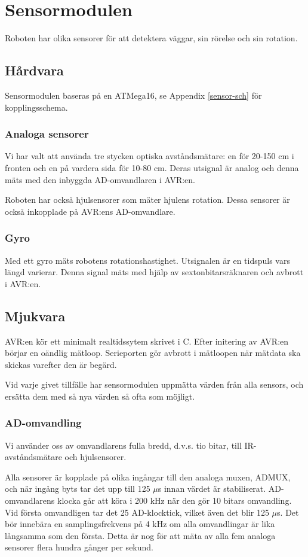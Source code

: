 \section{Sensormodulen}
Roboten har olika sensorer för att detektera väggar, sin rörelse och sin
rotation. 

\subsection{Hårdvara}
Sensormodulen baseras på en ATMega16, se Appendix \ref{sensor-sch} för
kopplingsschema.

\subsubsection{Analoga sensorer}
Vi har valt att använda tre stycken optiska avståndsmätare: en för 20-150 cm i
fronten och en på vardera sida för 10-80 cm. Deras utsignal är analog och denna
mäts med den inbyggda AD-omvandlaren i AVR:en.

Roboten har också hjulsensorer som mäter hjulens rotation. Dessa
sensorer är också inkopplade på AVR:ens AD-omvandlare. 

\subsubsection{Gyro}
Med ett gyro mäts robotens rotationshastighet. Utsignalen är en
tidspuls vars längd varierar. Denna signal mäts med hjälp av
sextonbitarsräknaren och avbrott i AVR:en.

\subsection{Mjukvara}
AVR:en kör ett minimalt realtidssytem skrivet i C. Efter initering
av AVR:en börjar en oändlig mätloop. Serieporten gör avbrott i mätloopen när
mätdata ska skickas varefter den är begärd.

Vid varje givet tillfälle har sensormodulen uppmätta värden från alla sensors,
och ersätta dem med så nya värden så ofta som möjligt.

\subsubsection{AD-omvandling}
Vi använder oss av omvandlarens fulla bredd, d.v.s. tio bitar, till
IR-avståndsmätare och hjulsensorer.

Alla sensorer är kopplade på olika ingångar till den analoga muxen, ADMUX, och
när ingång byts tar det upp till 125 $\mu$s innan värdet är stabiliserat.
AD-omvandlarens klocka går att köra i 200 kHz när den gör 10 bitars omvandling.
Vid första omvandligen tar det 25 AD-klocktick, vilket även det blir 125
$\mu$s. Det bör innebära en samplingsfrekvens på 4 kHz om alla omvandlingar är
lika långsamma som den första. Detta är nog för att mäta av alla fem analoga
sensorer flera hundra gånger per sekund.

